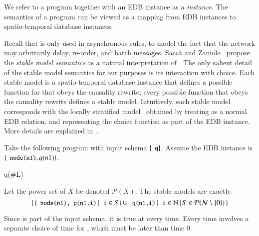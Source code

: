 
We refer to a \lang program together with an EDB instance as a {\em \lang instance}.  The semantics of a \lang program can be viewed as a mapping from EDB instances to spatio-temporal database instances.

Recall that  is only used in asynchronous rules, to model the fact that the network may arbitrarily delay, re-order, and batch messages.
Sacc\`{a} and Zaniolo~\cite{sacca-zaniolo} propose the {\em stable model semantics} as a natural interpretation of .  The only salient detail of the stable model semantics for our purposes is its interaction with choice.  Each stable model is a spatio-temporal database instance that defines a possible function for  that obeys the causality rewrite; every possible function that obeys the causality rewrite defines a stable model.  Intuitively, each stable model corresponds with the locally stratified model~\cite{stable-model} obtained by treating  as a normal EDB relation, and representing the choice function as part of the EDB instance.  More details are explained in~\cite{ameloot-operational}.

\begin{example}
\label{ex:infinitemodels}
Take the following \lang program with input schema $\{\dedalus{q}\}$.  Assume the EDB instance is $\{\dedalus{node(n1)}, q(n1)\}$.

\begin{Drules}
        {q(#L)}
\end{Drules}

Let the power set of $X$ be denoted $\mathcal{P}(X)$.  The stable models are exactly:
$$\left\{ \, \{\dedalus{node(n1), p(n1,i)} \, | \, \dedalus{i} \in S \} \cup {\dedalus{q(n1,i)} \, | \, \dedalus{i} \in \mathbb{N}} \, | \, S \in \mathcal{P}(\mathcal{N} \setminus \{0\}) \, \right\}$$


Since  is part of the input schema, it is true at every time.  Every time involves a separate choice of time for , which must be later than time 0.
\end{example}

